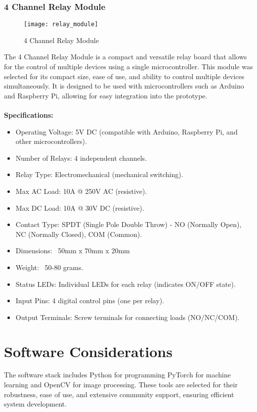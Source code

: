 \subsubsection{4 Channel Relay Module}
\begin{figure}[!htbp]
	\centering
	\texttt{[image: relay\_module]}
	\caption{4 Channel Relay Module}
	\label{fig:relay_module_fig}
\end{figure}
The 4 Channel Relay Module is a compact and versatile relay 
board that allows for the control of multiple devices using a single microcontroller.
This module was selected for its compact size, ease of use, and ability to control multiple devices simultaneously.
It is designed to be used with microcontrollers such as Arduino and Raspberry Pi,
allowing for easy integration into the prototype.
\\
\\
\textbf{Specifications:}
\begin{itemize}
    \item Operating Voltage: 5V DC (compatible with Arduino, Raspberry Pi, and other microcontrollers).
    \item Number of Relays: 4 independent channels.
    \item Relay Type: Electromechanical (mechanical switching).
    \item Max AC Load: 10A @ 250V AC (resistive).
    \item Max DC Load: 10A @ 30V DC (resistive).
    \item Contact Type: SPDT (Single Pole Double Throw) - NO (Normally Open), NC (Normally Closed), COM (Common).
    \item Dimensions: ~50mm x 70mm x 20mm 
    \item Weight: ~50-80 grams.
    \item Status LEDs: Individual LEDs for each relay (indicates ON/OFF state).
    \item Input Pins: 4 digital control pins (one per relay).
    \item Output Terminals: Screw terminals for connecting loads (NO/NC/COM).
\end{itemize}

\section{Software Considerations}
The software stack includes Python for programming PyTorch for machine learning and OpenCV for image processing. These tools are selected for their robustness, ease of use, and extensive community support, ensuring efficient system development.

